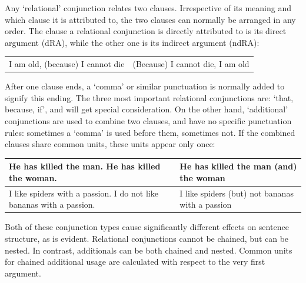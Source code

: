Any `relational' conjunction relates two clauses.  Irrespective of its meaning and which clause it is attributed to, the two clauses can normally be arranged in any order. The clause a relational conjunction is directly attributed to is its direct argument (dRA), while the other one is its indirect argument (ndRA):
\begin{example}
    \begin{tabular}{c|c}
    I am old, (because) I cannot die & (Because) I cannot die, I am old
    \end{tabular}
\end{example}
After one clause ends, a `comma' or similar punctuation is normally added to signify this ending. The three most important relational conjunctions are: `that, because, if', and will get special consideration. On the other hand, `additional' conjunctions are used to combine two  clauses, and have no specific punctuation rules: sometimes a `comma' is used before them, sometimes not. If the combined clauses share common units, these units appear only once:
\begin{example}
    \begin{tabular}{m{7cm}|m{6cm}}
        He has killed the man. He has killed the woman. & He has killed the man (and) the woman\\\hline
        I like spiders with a passion. I do not like bananas with a passion. & I like spiders (but) not bananas with a passion
    \end{tabular}
\end{example}
Both of these conjunction types cause significantly different effects on sentence structure, as is evident. Relational conjunctions cannot be chained, but  can be nested. In contrast,  additionals can be both chained and nested. Common units for chained additional usage are  calculated with respect to the very first argument.

